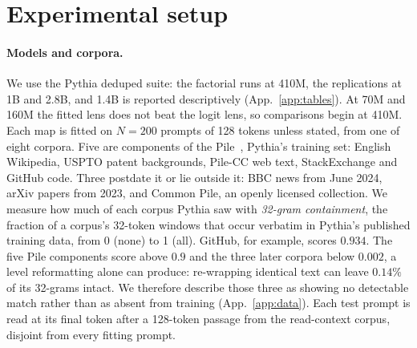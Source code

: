 \documentclass{article}
\begin{document}
\section{Experimental setup}
\label{sec:setup}

\paragraph{Models and corpora.} We use the Pythia deduped suite: the factorial runs at 410M, the
replications at 1B and 2.8B, and 1.4B is reported descriptively (App.~\ref{app:tables}). At 70M and
160M the fitted lens does not beat the logit lens, so comparisons begin at 410M. Each map is fitted on
$N{=}200$ prompts of 128 tokens unless stated, from one of eight corpora. Five are components of the
Pile~\citep{gao2021pile}, Pythia's training set: English Wikipedia, USPTO patent backgrounds, Pile-CC
web text, StackExchange and GitHub code. Three postdate it or lie outside it: BBC news from June 2024,
arXiv papers from 2023, and Common Pile, an openly licensed collection. We measure how much of each
corpus Pythia saw with \emph{32-gram containment}, the fraction of a corpus's 32-token windows that
occur verbatim in Pythia's published training data, from 0 (none) to 1 (all). GitHub, for example,
scores $0.934$. The five Pile components score above $0.9$ and the three later corpora below
$0.002$, a level reformatting alone can produce: re-wrapping identical text can leave $0.14\%$ of its
32-grams intact. We therefore describe those three as showing no detectable match rather than as
absent from training (App.~\ref{app:data}). Each test prompt is read
at its final token after a 128-token passage from the read-context corpus, disjoint from every
fitting prompt.
\end{document}
